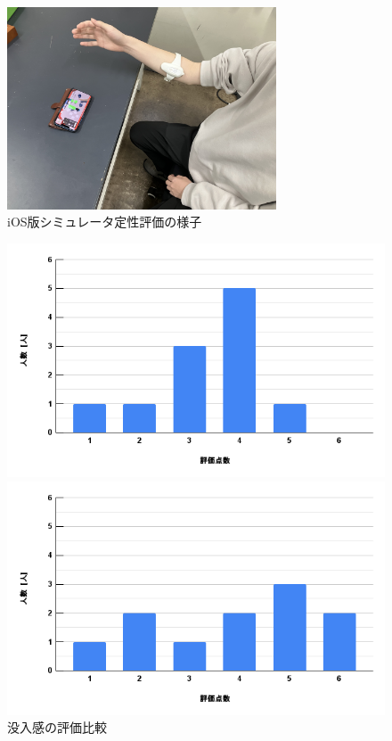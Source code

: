 \documentclass{ltjsreport}
\begin{document}
		\begin{figure}[H]
		\centering
		\includegraphics[width = 8cm]{../figs/IMG_6323.jpg}
		\caption{iOS版シミュレータ定性評価の様子}
		\label{fig:evaluationiOS}
		\end{figure}

		\begin{figure}[H]
		\centering
		\begin{minipage}{0.45\columnwidth}
		\centering
		\includegraphics[width = \columnwidth]{../figs/PC-1.png}
		\end{minipage}
		\hspace{0.04\columnwidth}
		\begin{minipage}{0.45\columnwidth}
		\centering
		\includegraphics[width = \columnwidth]{../figs/iOS-1.png}
		\end{minipage}
		\caption{没入感の評価比較}
		\end{figure}
\end{document}
